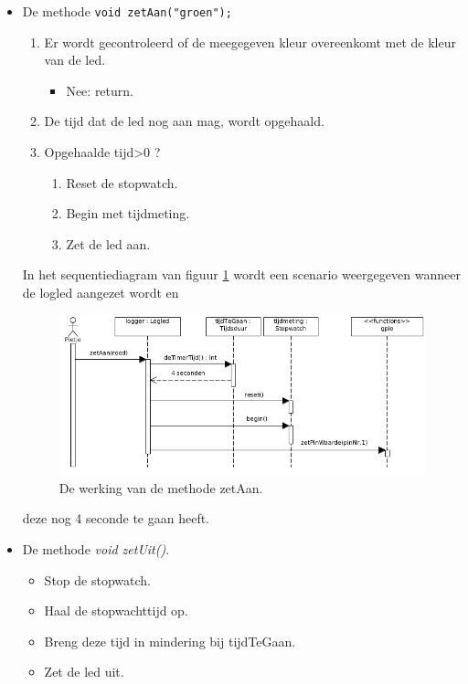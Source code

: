 \begin{itemize}
	\item De methode \texttt{void zetAan("groen");}  
	  \begin{enumerate}
	  	\item Er wordt gecontroleerd of de meegegeven kleur overeenkomt met de kleur van de led.
	  	\begin{itemize}
	  		\item Nee: return.
	  		
	  	\end{itemize}
	  	\item De tijd dat de led nog aan mag, wordt opgehaald.
	  	\item Opgehaalde tijd\textgreater  0 ?
	  		  	\begin{enumerate}
	  		\item Reset de stopwatch.
	  		\item Begin met tijdmeting.
	  		\item Zet de led aan.	  		
	  	\end{enumerate}
	  \end{enumerate}
  In het sequentiediagram van figuur \ref{fig:ll_zetAan} wordt een scenario weergegeven wanneer de logled aangezet wordt en 
      \begin{figure}[h!]
  	\captionsetup{justification=centering}
  	\includegraphics[width=0.8 \linewidth]{figuren/seqZetAan}      %
  \centering
  \caption{De werking van de methode zetAan.}
  \label{fig:ll_zetAan}
\end{figure} 
 deze nog 4 seconde te gaan heeft. 
 \newpage
 \item De methode \textit{ void zetUit()}. 
 \begin{itemize}
 	\item Stop de stopwatch.
 	\item Haal de stopwachttijd op.
 	\item Breng deze tijd in mindering bij tijdTeGaan.
 	\item Zet de led uit.
 \end{itemize} 

\end{itemize}
